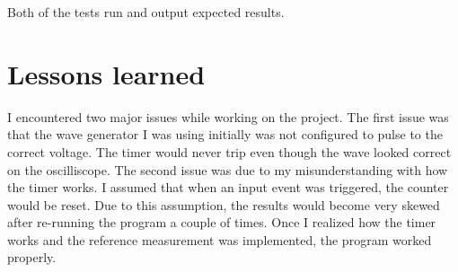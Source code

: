 \documentclass[CMPE]{KGCOEReport}
\begin{document}
    Both of the tests run and output expected results.

    \section*{Lessons learned}
    I encountered two major issues while working on the project. The first issue was
    that the wave generator I was using initially was not configured to pulse to the
    correct voltage. The timer would never trip even though the wave looked correct on
    the oscilliscope. The second issue was due to my misunderstanding with how the
    timer works. I assumed that when an input event was triggered, the counter would
    be reset. Due to this assumption, the results would become very skewed after
    re-running the program a couple of times. Once I realized how the timer works
    and the reference measurement was implemented, the program worked properly.
\end{document}
